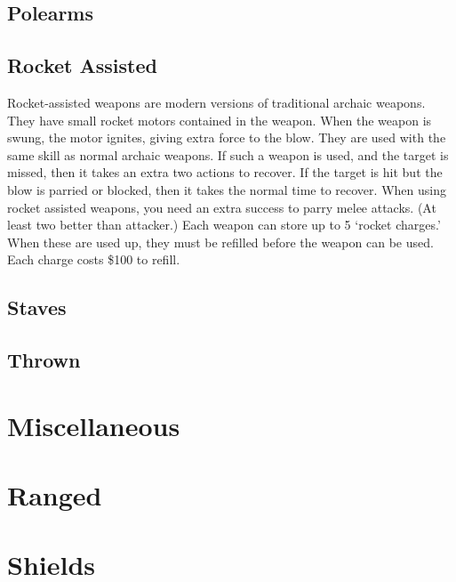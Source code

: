\documentclass[twoside]{book}
\begin{document}
    

\subsection{Polearms}
    
    

\subsection{Rocket Assisted}
      Rocket-assisted weapons are modern versions of
               traditional archaic weapons. They have small rocket motors
               contained in the weapon. When the weapon is swung, the
               motor ignites, giving extra force to the blow. They are
               used with the same skill as normal archaic weapons.
                 If such a weapon is used, and the target is missed,
               then it takes an extra two actions to recover. If the
               target is hit but the blow is parried or blocked, then it
               takes the normal time to recover.   When using rocket assisted weapons, you need an
               extra success to parry melee attacks. (At least two better
               than attacker.)   Each weapon can store up to 5 `rocket
               charges.' When these are used up, they must be
               refilled before the weapon can be used. Each charge costs
               \$100 to refill. 
    

\subsection{Staves}
    
    

\subsection{Thrown}
    
    

\section{Miscellaneous}
    
    

\section{Ranged}
    
    

\section{Shields}
    
\end{document}
